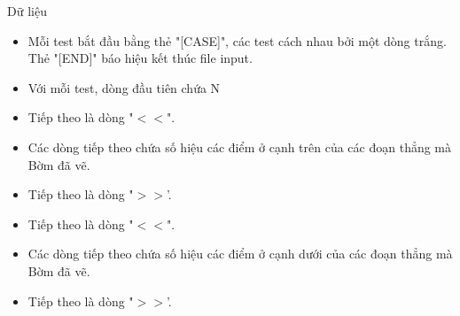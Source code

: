 Dữ liệu  
\begin{itemize}
	\item     Mỗi test bắt đầu bằng thẻ "[CASE]", các test cách nhau bởi một dòng trắng. Thẻ "[END]" báo hiệu kết thúc file input.   
	\item     Với mỗi test, dòng đầu tiên chứa N   
	\item     Tiếp theo là dòng "$<$$<$".   
	\item     Các dòng tiếp theo chứa số hiệu các điểm ở cạnh trên của các đoạn thẳng mà Bờm đã vẽ.   
	\item     Tiếp theo là dòng "$>$$>$'.   
	\item     Tiếp theo là dòng "$<$$<$".   
	\item     Các dòng tiếp theo chứa số hiệu các điểm ở cạnh dưới của các đoạn thẳng mà Bờm đã vẽ.   
	\item     Tiếp theo là dòng "$>$$>$'.   
\end{itemize}